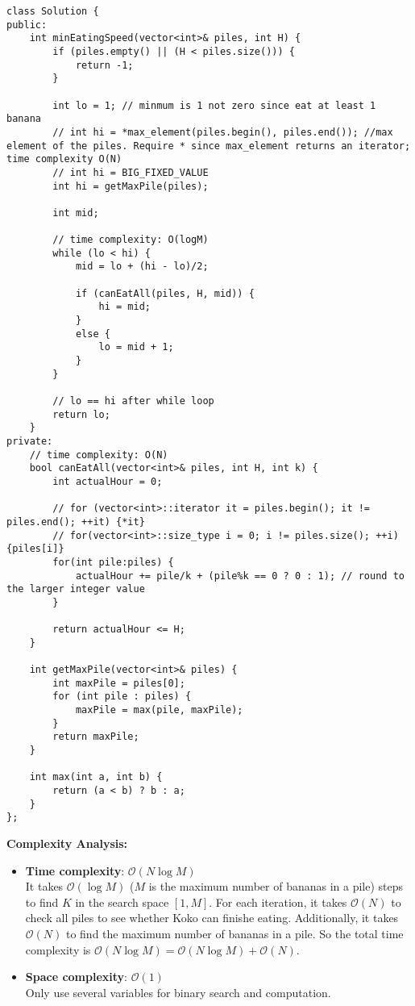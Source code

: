 \documentclass[justified]{tufte-book}
\begin{document}
\begin{lstlisting}
class Solution {
public:
    int minEatingSpeed(vector<int>& piles, int H) {
        if (piles.empty() || (H < piles.size())) {
            return -1;
        }
        
        int lo = 1; // minmum is 1 not zero since eat at least 1 banana
        // int hi = *max_element(piles.begin(), piles.end()); //max element of the piles. Require * since max_element returns an iterator; time complexity O(N)
        // int hi = BIG_FIXED_VALUE
        int hi = getMaxPile(piles);
        
        int mid;
       
        // time complexity: O(logM)
        while (lo < hi) {
            mid = lo + (hi - lo)/2;
            
            if (canEatAll(piles, H, mid)) {
                hi = mid;
            }
            else {
                lo = mid + 1;
            }
        }
        
        // lo == hi after while loop
        return lo;
    }
private:
    // time complexity: O(N)
    bool canEatAll(vector<int>& piles, int H, int k) {
        int actualHour = 0;
        
        // for (vector<int>::iterator it = piles.begin(); it != piles.end(); ++it) {*it}
        // for(vector<int>::size_type i = 0; i != piles.size(); ++i) {piles[i]}
        for(int pile:piles) {
            actualHour += pile/k + (pile%k == 0 ? 0 : 1); // round to the larger integer value 
        }
        
        return actualHour <= H;
    }
    
    int getMaxPile(vector<int>& piles) {
        int maxPile = piles[0];
        for (int pile : piles) {
            maxPile = max(pile, maxPile);
        }
        return maxPile;
    }
    
    int max(int a, int b) {
        return (a < b) ? b : a;
    }
};
\end{lstlisting}
\noindent \textbf{Complexity Analysis:}
\begin{itemize}
    \item \textbf{Time complexity}: $\mathcal{O}(N \log M)$\\
    It takes $\mathcal{O}(\log M)$ ($M$ is the maximum number of bananas in a pile) steps to find $K$ in the search space $[1, M]$. For each iteration, it takes $\mathcal{O}(N)$ to check all piles to see whether Koko can finishe eating. Additionally, it takes $\mathcal{O}(N)$ to find the maximum number of bananas in a pile. So the total time complexity is $\mathcal{O}(N \log M) = \mathcal{O}(N \log M) + \mathcal{O}(N)$.
    \item \textbf{Space complexity}: $\mathcal{O}(1)$ \\
    Only use several variables for binary search and computation.
\end{itemize}
\end{document}
